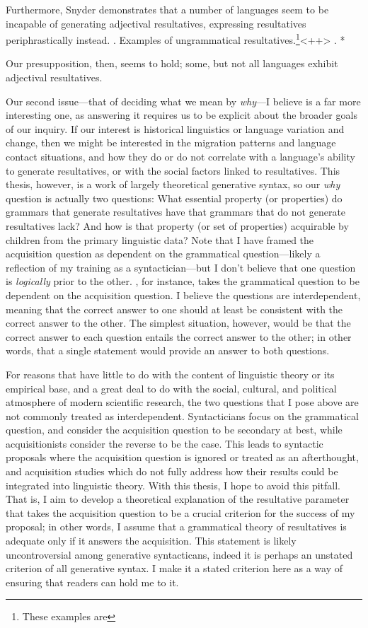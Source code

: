 \documentclass[MilwayThesis]{subfiles}
\begin{document}
Furthermore, Snyder demonstrates that a number of languages seem to be incapable of generating adjectival resultatives, expressing resultatives periphrastically instead.
\ex. Examples of ungrammatical resultatives.\footnote{These examples are }<++>
\ag. *

Our presupposition, then, seems to hold; some, but not all languages exhibit adjectival resultatives.

Our second issue---that of deciding what we mean by \textit{why}---I believe is a far more interesting one, as answering it requires us to be explicit about the broader goals of our inquiry.
If our interest is historical linguistics or language variation and change, then we might be interested in the migration patterns and language contact situations, and how they do or do not correlate with a language's ability to generate resultatives, or with the social factors linked to resultatives.
This thesis, however, is a work of largely theoretical generative syntax, so our \textit{why} question is actually two questions: What essential property (or properties) do grammars that generate resultatives have that grammars that do not generate resultatives lack? And how is that property (or set of properties) acquirable by children from the primary linguistic data?
Note that I have framed the acquisition question as dependent on the grammatical question---likely a reflection of my training as a syntactician---but I don't believe that one question is \textit{logically} prior to the other.
\textcite{snyder1995language,snyder2001nature}, for instance, takes the grammatical question to be dependent on the acquisition question.
I believe the questions are interdependent, meaning that the correct answer to one should at least be consistent with the correct answer to the other.
The simplest situation, however, would be that the correct answer to each question entails the correct answer to the other; in other words, that a single statement would provide an answer to both questions.

For reasons that have little to do with the content of linguistic theory or its empirical base, and a great deal to do with the social, cultural, and political atmosphere of modern scientific research, the two questions that I pose above are not commonly treated as interdependent.
Syntacticians focus on the grammatical question, and consider the acquisition question to be secondary at best, while acquisitionists consider the reverse to be the case.
This leads to syntactic proposals where the acquisition question is ignored or treated as an afterthought, and acquisition studies which do not fully address how their results could be integrated into linguistic theory.
With this thesis, I hope to avoid this pitfall.
That is, I aim to develop a theoretical explanation of the resultative parameter that takes the acquisition question to be a crucial criterion for the success of my proposal; in other words, I assume that a grammatical theory of resultatives is adequate only if it answers the acquisition.
This statement is likely uncontroversial among generative syntacticans, indeed it is perhaps an unstated criterion of all generative syntax.
I make it a stated criterion here as a way of ensuring that readers can hold me to it.
\end{document}
